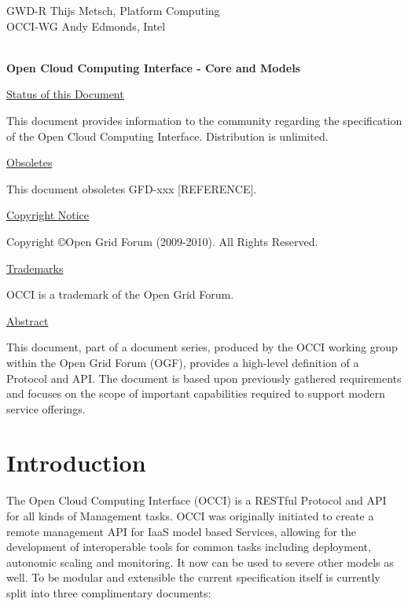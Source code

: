 \documentclass[10pt,a4paper,british]{article}
\begin{document}
\thispagestyle{empty}

GWD-R \hfill  Thijs Metsch, Platform Computing\\
OCCI-WG \hfill  Andy Edmonds, Intel\\
\\

\vspace*{0.5in}

\begin{Large}
\textbf{Open Cloud Computing Interface - Core and Models}
\end{Large}

\vspace*{0.5in}

\underline{Status of this Document}

This document provides information to the community regarding the
specification of the Open Cloud Computing Interface. Distribution is
unlimited.

\underline{Obsoletes}

This document obsoletes GFD-xxx [REFERENCE].

\underline{Copyright Notice}

Copyright \copyright Open Grid Forum (2009-2010). All Rights Reserved.

\underline{Trademarks}

OCCI is a trademark of the Open Grid Forum.

\underline{Abstract}

This document, part of a document series, produced by the OCCI working
group within the Open Grid Forum (OGF), provides a high-level
definition of a Protocol and API. The document is based upon
previously gathered requirements and focuses on the scope of important
capabilities required to support modern service offerings.

\newpage
\tableofcontents
\newpage

\section{Introduction}
The Open Cloud Computing Interface (OCCI) is a RESTful Protocol and
API for all kinds of
Management tasks. OCCI was originally initiated to create a remote
management API for IaaS model based Services, allowing for the
development of interoperable tools for common tasks including
deployment, autonomic scaling and monitoring. It now can be used to
severe other models as well. To be modular and extensible the current
specification itself is currently split into three complimentary
documents:
\end{document}

